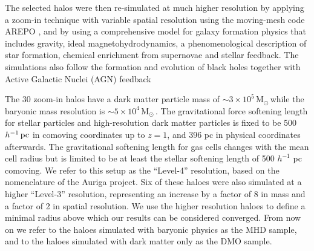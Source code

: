 \documentclass[usenatbib]{mnras}
\newcommand{\Msun}{\,{\rm M}$_{\odot}$\,}
\begin{document}
The selected halos were then re-simulated at much higher resolution by applying a
zoom-in technique with variable spatial resolution using the moving-mesh code AREPO  \citep{arepo, 2013MNRAS.432..176P},
and by using a comprehensive model for galaxy formation physics
that includes gravity, ideal magnetohydrodynamics,  a phenomenological
description of star formation, chemical enrichment from supernovae
and stellar feedback.   
The simulations also follow the formation and evolution of black holes
together with  Active Galactic Nuclei (AGN) feedback


The 30 zoom-in halos have a dark matter particle mass of $\sim 3\times
10^5$\Msun while the baryonic mass resolution is $\sim 5\times 10^4$\Msun.
The gravitational force softening length for stellar
particles and high-resolution dark matter particles 
is fixed to be 500 $h^{-1}\,{\rm  pc}$ in comoving coordinates up to $z=1$,
and 396 pc in physical coordinates afterwards.
The gravitational softening length for gas cells changes with the mean
cell radius but is limited to be at least the stellar softening
length of 500 $h^{-1}$ pc comoving. 
 We refer to this setup as the ``Level-4'' resolution, based on the nomenclature of the Auriga project.
Six of these haloes were also simulated at a higher ``Level-3'' resolution, 
representing an increase by a factor of 8 in mass and a factor of 2 in spatial
resolution.  
We use the higher resolution haloes to define a minimal radius above
which our results can be considered converged.
From now on we refer to the haloes simulated with baryonic physics as the
MHD sample, and to the haloes simulated with dark matter only as the
DMO sample.
\end{document}
